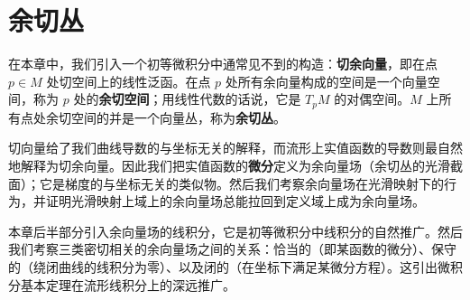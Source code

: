 \documentclass[../main.tex]{subfiles}
\begin{document}
\chapter{余切丛}\label{chapter:ch11-余切丛}

在本章中，我们引入一个初等微积分中通常见不到的构造：\textbf{切余向量}，即在点 $p\in M$ 处切空间上的线性泛函。在点 $p$ 处所有余向量构成的空间是一个向量空间，称为 $p$ 处的\textbf{余切空间}；用线性代数的话说，它是 $T_pM$ 的对偶空间。$M$ 上所有点处余切空间的并是一个向量丛，称为\textbf{余切丛}。

切向量给了我们曲线导数的与坐标无关的解释，而流形上实值函数的导数则最自然地解释为切余向量。因此我们把实值函数的\textbf{微分}定义为余向量场（余切丛的光滑截面）；它是梯度的与坐标无关的类似物。然后我们考察余向量场在光滑映射下的行为，并证明光滑映射上域上的余向量场总能拉回到定义域上成为余向量场。

本章后半部分引入余向量场的线积分，它是初等微积分中线积分的自然推广。然后我们考察三类密切相关的余向量场之间的关系：恰当的（即某函数的微分）、保守的（绕闭曲线的线积分为零）、以及闭的（在坐标下满足某微分方程）。这引出微积分基本定理在流形线积分上的深远推广。







\end{document}
